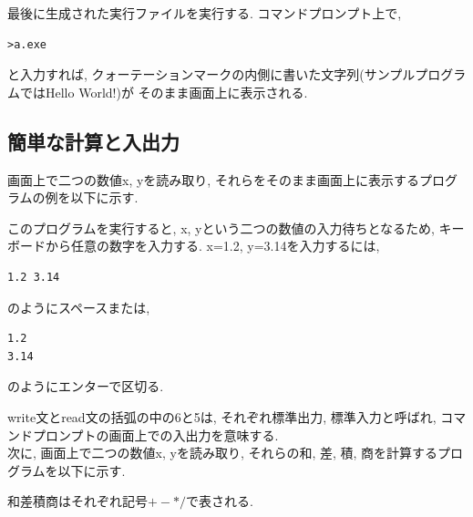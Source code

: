 \documentclass[a4j]{jsarticle}
\begin{document}
最後に生成された実行ファイルを実行する. コマンドプロンプト上で, 
\begin{Verbatim}[frame=single]
>a.exe
\end{Verbatim}
と入力すれば, クォーテーションマークの内側に書いた文字列(サンプルプログラムではHello World!)が
そのまま画面上に表示される. 

\subsection{簡単な計算と入出力}
画面上で二つの数値x, yを読み取り, それらをそのまま画面上に表示するプログラムの例を以下に示す. 

このプログラムを実行すると, x, yという二つの数値の入力待ちとなるため, 
キーボードから任意の数字を入力する. 
x=1.2, y=3.14を入力するには, 
\begin{Verbatim}[frame=single]
1.2 3.14
\end{Verbatim}
のようにスペースまたは, 
\begin{Verbatim}[frame=single]
1.2
3.14
\end{Verbatim}
のようにエンターで区切る. 

write文とread文の括弧の中の6と5は, 
それぞれ標準出力, 標準入力と呼ばれ, コマンドプロンプトの画面上での入出力を意味する. \\


次に, 画面上で二つの数値x, yを読み取り, それらの和, 差, 積, 商を計算するプログラムを以下に示す.  

和差積商はそれぞれ記号$+-*/$で表される. 
\\

\end{document}
